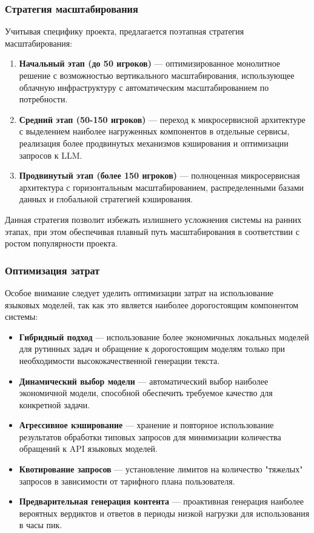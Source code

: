 \subsubsection{Стратегия масштабирования}

Учитывая специфику проекта, предлагается поэтапная стратегия масштабирования:

\begin{enumerate}
    \item \textbf{Начальный этап (до 50 игроков)} — оптимизированное монолитное решение с возможностью вертикального масштабирования, использующее облачную инфраструктуру с автоматическим масштабированием по потребности.

    \item \textbf{Средний этап (50-150 игроков)} — переход к микросервисной архитектуре с выделением наиболее нагруженных компонентов в отдельные сервисы, реализация более продвинутых механизмов кэширования и оптимизации запросов к LLM.

    \item \textbf{Продвинутый этап (более 150 игроков)} — полноценная микросервисная архитектура с горизонтальным масштабированием, распределенными базами данных и глобальной стратегией кэширования.
\end{enumerate}

Данная стратегия позволит избежать излишнего усложнения системы на ранних этапах, при этом обеспечивая плавный путь масштабирования в соответствии с ростом популярности проекта.

\subsubsection{Оптимизация затрат}

Особое внимание следует уделить оптимизации затрат на использование языковых моделей, так как это является наиболее дорогостоящим компонентом системы:

\begin{itemize}
    \item \textbf{Гибридный подход} — использование более экономичных локальных моделей для рутинных задач и обращение к дорогостоящим моделям только при необходимости высококачественной генерации текста.

    \item \textbf{Динамический выбор модели} — автоматический выбор наиболее экономичной модели, способной обеспечить требуемое качество для конкретной задачи.

    \item \textbf{Агрессивное кэширование} — хранение и повторное использование результатов обработки типовых запросов для минимизации количества обращений к API языковых моделей.

    \item \textbf{Квотирование запросов} — установление лимитов на количество "тяжелых" запросов в зависимости от тарифного плана пользователя.

    \item \textbf{Предварительная генерация контента} — проактивная генерация наиболее вероятных вердиктов и ответов в периоды низкой нагрузки для использования в часы пик.
\end{itemize}

